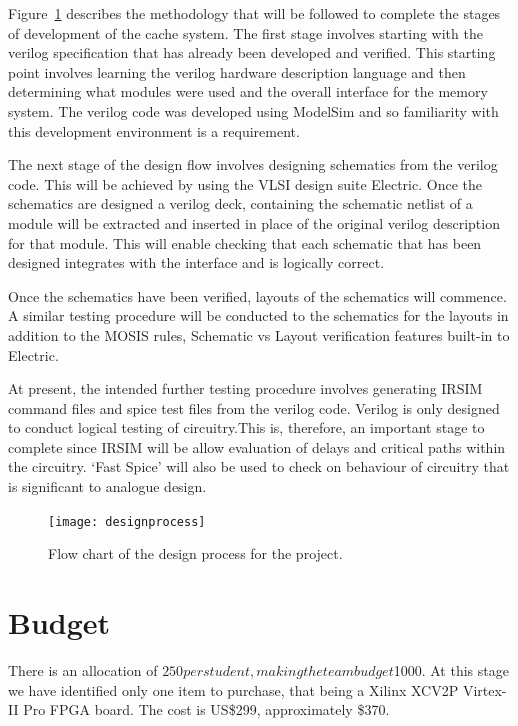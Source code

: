 \documentclass[a4paper,12pt]{article}
\begin{document}
Figure~\ref{designprocess} describes the methodology that will be
followed to complete the stages of development of the cache
system. The first stage involves starting with the verilog
specification that has already been developed and verified. This
starting point involves learning the verilog hardware description
language and then determining what modules were used and the overall
interface for the memory system. The verilog code was developed using
ModelSim and so familiarity with this development environment is a
requirement.

The next stage of the design flow involves designing schematics from
the verilog code. This will be achieved by using the VLSI design suite
Electric. Once the schematics are designed a verilog deck, containing
the schematic netlist of a module will be extracted and inserted in
place of the original verilog description for that module. This will
enable checking that each schematic that has been designed integrates
with the interface and is logically correct.

Once the schematics have been verified, layouts of the schematics will
commence. A similar testing procedure will be conducted to the
schematics for the layouts in addition to the MOSIS rules, Schematic
vs Layout verification features built-in to Electric.

At present, the intended further testing procedure involves generating
IRSIM command files and spice test files from the verilog
code. Verilog is only designed to conduct logical testing of
circuitry.This is, therefore, an important stage to complete since
IRSIM will be allow evaluation of delays and critical paths within the
circuitry. `Fast Spice' will also be used to check on behaviour of
circuitry that is significant to analogue design.

\begin{figure}
\centering 
\texttt{[image: designprocess]}
\caption{Flow chart of the design process for the project.}
\label{designprocess}
\end{figure}





\section{Budget}

There is an allocation of $250 per student, making the team budget
$1000. At this stage we have identified only one item to purchase,
that being a Xilinx XCV2P Virtex-II Pro FPGA board. The cost is
US\$299, approximately \$370. 
\end{document}
